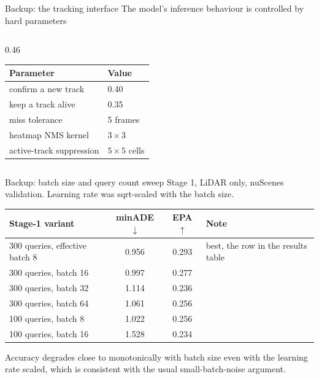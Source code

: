 \documentclass[aspectratio=169,11pt,t]{beamer}
\newcommand{\up}{$\uparrow$}
\newcommand{\dn}{$\downarrow$}
\begin{document}
\begin{frame}{Backup: the tracking interface}
  The model's inference behaviour is controlled by hard parameters 

  \vspace{0.4em}
  \begin{columns}[T,onlytextwidth]
    \begin{column}{0.46\textwidth}
      \footnotesize
      \begin{tabular}{ll}
        \toprule
        Parameter & Value \\
        \midrule
        confirm a new track   & 0.40 \\
        keep a track alive    & 0.35 \\
        miss tolerance        & 5 frames \\
        heatmap NMS kernel    & $3{\times}3$ \\
        active-track suppression & $5{\times}5$ cells \\
        \bottomrule
      \end{tabular}
    \end{column}
  \end{columns}
\end{frame}

\begin{frame}{Backup: batch size and query count sweep}
  \footnotesize
  Stage 1, LiDAR only, nuScenes validation. Learning rate was sqrt-scaled with
  the batch size.

  \vspace{0.4em}
  \begin{table}
    \centering
    \begin{tabular}{lccl}
      \toprule
      Stage-1 variant & minADE \dn & EPA \up & Note \\
      \midrule
      300 queries, effective batch 8  & 0.956 & 0.293 & best, the row in the results table \\
      300 queries, batch 16 & 0.997 & 0.277 & \\
      300 queries, batch 32 & 1.114 & 0.236 & \\
      300 queries, batch 64 & 1.061 & 0.256 & \\
      100 queries, batch 8  & 1.022 & 0.256 & \\
      100 queries, batch 16 & 1.528 & 0.234 & \\
      \bottomrule
    \end{tabular}
  \end{table}

  \vspace{0.4em}
  \normalsize
  Accuracy degrades close to monotonically with batch size even with the
  learning rate scaled, which is consistent with the usual small-batch-noise
  argument.
\end{frame}
\end{document}
